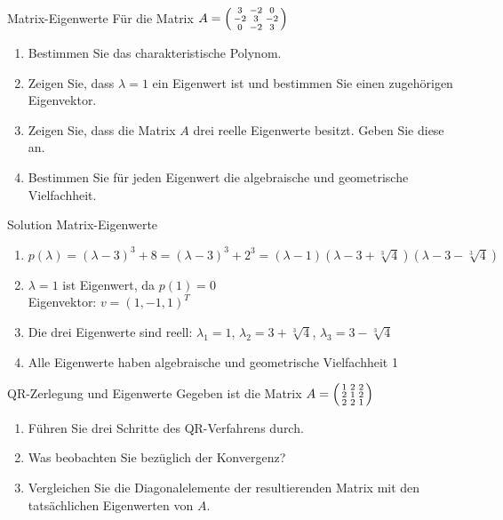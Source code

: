 \begin{example2}{Matrix-Eigenwerte}
Für die Matrix
$A = \begin{psmallmatrix}
3 & -2 & 0\\
-2 & 3 & -2\\
0 & -2 & 3
\end{psmallmatrix}$
\begin{enumerate}
    \item Bestimmen Sie das charakteristische Polynom.
    
    \item Zeigen Sie, dass $\lambda = 1$ ein Eigenwert ist und bestimmen Sie einen zugehörigen Eigenvektor.
    
    \item Zeigen Sie, dass die Matrix $A$ drei reelle Eigenwerte besitzt. Geben Sie diese an.
    
    \item Bestimmen Sie für jeden Eigenwert die algebraische und geometrische Vielfachheit.
\end{enumerate}
\end{example2}

\begin{KR}{Solution Matrix-Eigenwerte}
\begin{enumerate}
    \item $p(\lambda) = (\lambda-3)^3 + 8 = (\lambda-3)^3 + 2^3 = (\lambda-1)(\lambda-3+\sqrt[3]{4})(\lambda-3-\sqrt[3]{4})$
    
    \item $\lambda = 1$ ist Eigenwert, da $p(1) = 0$\\
    Eigenvektor: $v = (1,-1,1)^T$
    
    \item Die drei Eigenwerte sind reell:
    $\lambda_1 = 1$,
    $\lambda_2 = 3+\sqrt[3]{4}$,
    $\lambda_3 = 3-\sqrt[3]{4}$
    
    \item Alle Eigenwerte haben algebraische und geometrische Vielfachheit 1
\end{enumerate}
\end{KR}

\begin{example2}{QR-Zerlegung und Eigenwerte}
Gegeben ist die Matrix
$A = \begin{psmallmatrix}
1 & 2 & 2\\
2 & 1 & 2\\
2 & 2 & 1
\end{psmallmatrix}$
\begin{enumerate}
    \item Führen Sie drei Schritte des QR-Verfahrens durch.
    
    \item Was beobachten Sie bezüglich der Konvergenz? 
    
    \item Vergleichen Sie die Diagonalelemente der resultierenden Matrix mit den tatsächlichen Eigenwerten von $A$.
\end{enumerate}
\end{example2}

